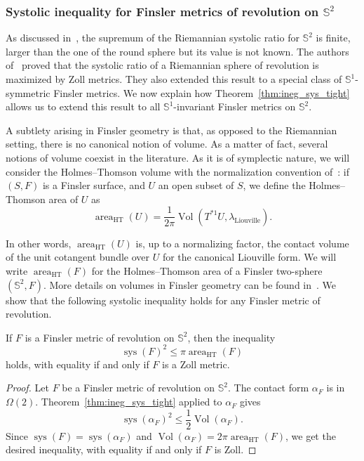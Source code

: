 \documentclass[AHL,Unicode,longabstracts]{cedram}
\DeclareMathOperator{\vol}{Vol}
\DeclareMathOperator{\sys}{sys}
\DeclareMathOperator{\area}{area}
\DeclareMathOperator{\Liouv}{Liouville}
\DeclareMathOperator{\HT}{HT}
\newcommand{\bbS}{\mathbb{S}}
\newcommand{\bbS}{\mathbb{S}}
\begin{document}
\subsubsection{Systolic inequality for Finsler metrics of revolution on \texorpdfstring{$\bbS^2$}{S2}}
\label{ssub:Finsler}
As discussed in~\cite{MR0918453}, the supremum of the Riemannian systolic ratio for $\bbS^2$ is finite, larger than the one of the round sphere but its value is not known. The authors of~\cite{ABHS_revol} proved that the systolic ratio of a Riemannian sphere of revolution is maximized by Zoll metrics. They also extended this result to a special class of $\bbS^1$-symmetric Finsler metrics. We now explain how Theorem~\ref{thm:ineg_sys_tight} allows us to extend this result to all $\bbS^1$-invariant Finsler metrics on $\bbS^2$.

A subtlety arising in Finsler geometry is that, as opposed to the Riemannian setting, there is no canonical notion of volume. As a matter of fact, several notions of volume coexist in the literature. As it is of symplectic nature, we will consider the Holmes--Thomson volume with the normalization convention of~\cite{ABHS_revol}: if $(S,F)$ is a Finsler surface, and $U$ an open subset of $S$, we define the Holmes--Thomson area of $U$ as
\[
\area_{\HT}(U) = \frac{1}{2 \pi} \vol\left(T^{*1}U, \lambda_{\Liouv}\right).
\]

In other words, $\area_{\HT}(U)$ is, up to a normalizing factor, the contact volume of the unit cotangent bundle over $U$ for the canonical Liouville form. We will write $\area_{\HT}(F)$ for the Holmes--Thomson area of a Finsler two-sphere $(\bbS^2, F)$. More details on volumes in Finsler geometry can be found in~\cite{paiva2004volumes}. We show that the following systolic inequality holds for any Finsler metric of revolution.
\begin{coro}\label{coro:finsler}
If $F$ is a Finsler metric of revolution on $\bbS^2$, then the inequality
\[
\sys(F)^2 \leq \pi \area_{\HT}(F)
\]
holds, with equality if and only if $F$ is a Zoll metric.
\end{coro}

\begin{proof}
Let $F$ be a Finsler metric of revolution on $\bbS^2$. The contact form $\alpha_F$ is in $\Omega(2)$. Theorem~\ref{thm:ineg_sys_tight} applied to $\alpha_F$ gives
\[
\sys(\alpha_F)^2 \leq \frac{1}{2} \vol(\alpha_F).
\]
Since $\sys(F) = \sys(\alpha_F)$ and $\vol(\alpha_F) = 2 \pi \area_{\HT}(F)$, we get the desired inequality, with equality if and only if $F$ is Zoll.
\end{proof}
\end{document}
